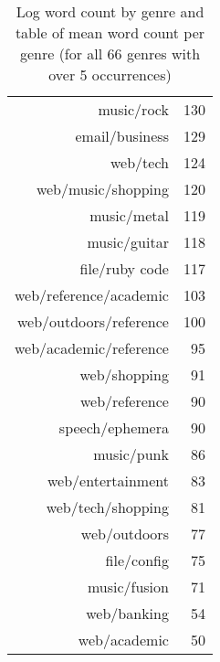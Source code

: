 \begin{table}[ht]
\begin{tabular}{rr}
        music/rock &  130 \\
        email/business &  129 \\ 
        web/tech &  124 \\ 
        web/music/shopping &  120 \\ 
        music/metal &  119 \\ 
        music/guitar &  118 \\ 
        file/ruby code &  117 \\ 
        web/reference/academic &  103 \\ 
        web/outdoors/reference &  100 \\ 
        web/academic/reference &   95 \\ 
        web/shopping &   91 \\ 
        web/reference &   90 \\ 
        speech/ephemera &   90 \\ 
        music/punk &   86 \\ 
        web/entertainment &   83 \\ 
        web/tech/shopping &   81 \\ 
        web/outdoors &   77 \\ 
        file/config &   75 \\ 
        music/fusion &   71 \\ 
        web/banking &   54 \\ 
        web/academic &   50 \\ 
        \hline
    \end{tabular}
    

    \label{fig:presonal:genreworddist}
    \caption{Log word count by genre and table of mean word count per genre (for all 66 genres with over 5 occurrences)}
\end{table}

